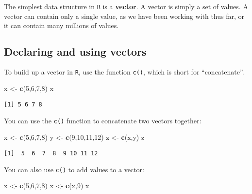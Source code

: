 \documentclass[
]{book}
\newenvironment{Shaded}{\begin{snugshade}}{\end{snugshade}}
\newcommand{\DecValTok}[1]{\textcolor[rgb]{0.00,0.00,0.81}{#1}}
\newcommand{\KeywordTok}[1]{\textcolor[rgb]{0.13,0.29,0.53}{\textbf{#1}}}
\newcommand{\NormalTok}[1]{#1}
\newcommand{\StringTok}[1]{\textcolor[rgb]{0.31,0.60,0.02}{#1}}
\begin{document}
The simplest data structure in \texttt{R} is a \textbf{vector}. A vector is simply a set of values. A vector can contain only a single value, as we have been working with thus far, or it can contain many millions of values.

\hypertarget{declaring-and-using-vectors}{%
\subsection*{Declaring and using vectors}\label{declaring-and-using-vectors}}

To build up a vector in \texttt{R}, use the function \texttt{c()}, which is short for ``concatenate''.

\begin{Shaded}
\begin{Highlighting}[]
\NormalTok{x <-}\StringTok{ }\KeywordTok{c}\NormalTok{(}\DecValTok{5}\NormalTok{,}\DecValTok{6}\NormalTok{,}\DecValTok{7}\NormalTok{,}\DecValTok{8}\NormalTok{)}
\NormalTok{x}
\end{Highlighting}
\end{Shaded}

\begin{verbatim}
[1] 5 6 7 8
\end{verbatim}

You can use the \texttt{c()} function to concatenate two vectors together:

\begin{Shaded}
\begin{Highlighting}[]
\NormalTok{x <-}\StringTok{ }\KeywordTok{c}\NormalTok{(}\DecValTok{5}\NormalTok{,}\DecValTok{6}\NormalTok{,}\DecValTok{7}\NormalTok{,}\DecValTok{8}\NormalTok{)}
\NormalTok{y <-}\StringTok{ }\KeywordTok{c}\NormalTok{(}\DecValTok{9}\NormalTok{,}\DecValTok{10}\NormalTok{,}\DecValTok{11}\NormalTok{,}\DecValTok{12}\NormalTok{)}
\NormalTok{z <-}\StringTok{ }\KeywordTok{c}\NormalTok{(x,y)}
\NormalTok{z}
\end{Highlighting}
\end{Shaded}

\begin{verbatim}
[1]  5  6  7  8  9 10 11 12
\end{verbatim}

You can also use \texttt{c()} to add values to a vector:

\begin{Shaded}
\begin{Highlighting}[]
\NormalTok{x <-}\StringTok{ }\KeywordTok{c}\NormalTok{(}\DecValTok{5}\NormalTok{,}\DecValTok{6}\NormalTok{,}\DecValTok{7}\NormalTok{,}\DecValTok{8}\NormalTok{)}
\NormalTok{x <-}\StringTok{ }\KeywordTok{c}\NormalTok{(x,}\DecValTok{9}\NormalTok{)}
\NormalTok{x}
\end{Highlighting}
\end{Shaded}
\end{document}
